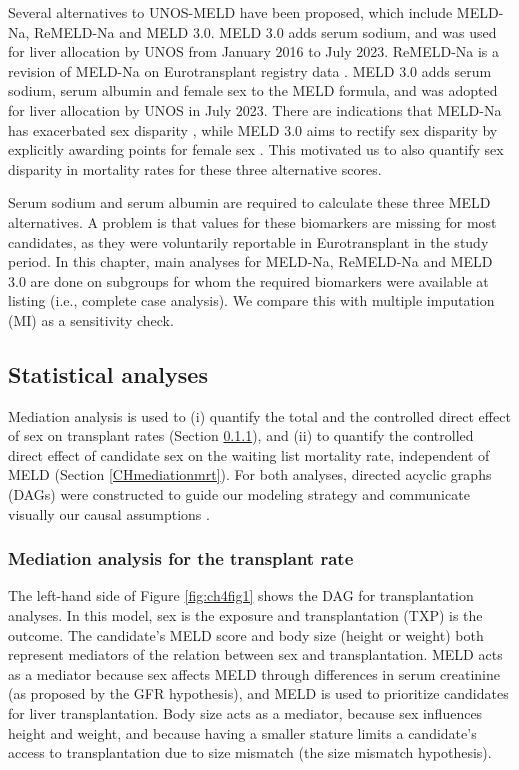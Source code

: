 \documentclass[11pt,twoside,]{book}
\begin{document}
Several alternatives to UNOS-MELD have been proposed, which include MELD-Na,
ReMELD-Na and MELD 3.0. MELD 3.0 adds serum sodium, and was used for
liver allocation by UNOS from January 2016 to July 2023. ReMELD-Na
is a revision of MELD-Na on Eurotransplant registry data \citep{goudsmitRefittingModelEndstage2020}.
MELD 3.0 adds serum sodium, serum albumin and female sex to the MELD formula,
and was adopted for liver allocation by UNOS in July 2023. There are indications that
MELD-Na has exacerbated sex disparity \citep{allenReducedAccessLiver2018}, while MELD
3.0 aims to rectify sex disparity by explicitly awarding points for female sex
\citep{kimMELD3point0}. This motivated us to also quantify sex disparity in mortality rates
for these three alternative scores.

Serum sodium and serum albumin are required to calculate these three MELD
alternatives. A problem is that values for these biomarkers are missing for
most candidates, as they were voluntarily reportable in Eurotransplant in the
study period. In this
chapter, main analyses for MELD-Na, ReMELD-Na and MELD 3.0 are done on subgroups
for whom the required biomarkers were available at listing (i.e., complete case analysis).
We compare this with multiple imputation (MI) as a sensitivity check.

\subsection{Statistical analyses}\label{statistical-analyses}

Mediation analysis is used to (i) quantify the total and the controlled direct
effect of sex on transplant rates (Section \ref{CHmediationtxp}),
and (ii) to quantify the controlled direct effect of candidate sex on the
waiting list mortality rate, independent of MELD (Section \ref{CHmediationmrt}).
For both analyses, directed acyclic graphs (DAGs) were constructed to guide
our modeling strategy and communicate visually our causal assumptions
\citep{lipskyCausalDirectedAcyclic2022}.

\subsubsection{Mediation analysis for the transplant rate}\label{CHmediationtxp}

The left-hand side of Figure \ref{fig:ch4fig1} shows the DAG for transplantation
analyses. In this model, sex is the exposure and
transplantation (TXP) is the outcome. The candidate's MELD score and body size
(height or weight) both represent mediators of the relation between sex and transplantation.
MELD acts as a mediator because sex affects MELD through differences in serum creatinine
(as proposed by the GFR hypothesis), and MELD is used to prioritize candidates for
liver transplantation. Body size acts as a mediator, because sex influences height
and weight, and because having a smaller stature limits a candidate's access
to transplantation due to size mismatch (the size mismatch hypothesis).
\end{document}
